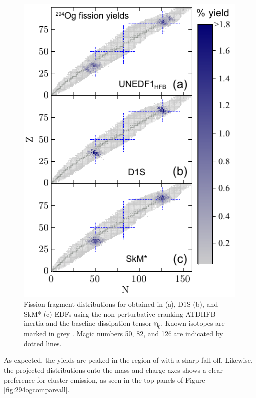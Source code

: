 \begin{figure}
	\centering
	\includegraphics[width=0.9\linewidth]{TeX_files/294Og_3yields}
	\caption[N-Z fission fragment yields from $^{294}$Og]{Fission fragment distributions for \Og{} obtained in \hfb{} (a), D1S (b), and SkM* (c) EDFs using the non-perturbative cranking ATDHFB inertia and  the baseline  dissipation tensor $\mathbf{\eta}_0$. Known isotopes are marked in grey \cite{NUDAT}. Magic numbers 50, 82, and 126 are indicated by dotted lines.}
	\label{fig:294og3yields}
\end{figure}

As expected, the yields are peaked in the region of {\Pb} with a sharp fall-off. Likewise, the projected distributions onto the mass and charge axes shows a clear preference for cluster emission, as seen in the top panels of Figure \ref{fig:294ogcompareall}.

